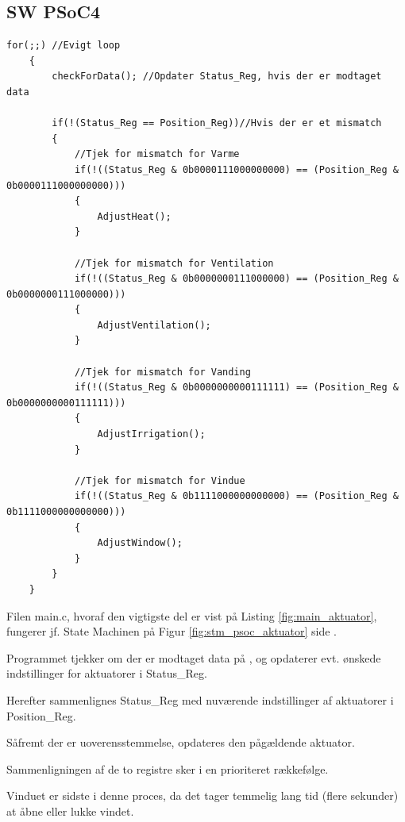 \clearpage

\subsection{SW PSoC4}
\label{subsec:sw_aktuator}

\begin{lstlisting}[caption=Udsnit af main.c for PSoC4 i Aktuator, label=fig:main_aktuator]
    for(;;) //Evigt loop
    {
        checkForData(); //Opdater Status_Reg, hvis der er modtaget data
        
        if(!(Status_Reg == Position_Reg))//Hvis der er et mismatch
        {
            //Tjek for mismatch for Varme
            if(!((Status_Reg & 0b0000111000000000) == (Position_Reg & 0b0000111000000000)))
            {
                AdjustHeat();
            }
            
            //Tjek for mismatch for Ventilation
            if(!((Status_Reg & 0b0000000111000000) == (Position_Reg & 0b0000000111000000)))
            {
                AdjustVentilation();
            }
            
            //Tjek for mismatch for Vanding
            if(!((Status_Reg & 0b0000000000111111) == (Position_Reg & 0b0000000000111111)))
            {
                AdjustIrrigation();
            }
            
            //Tjek for mismatch for Vindue
            if(!((Status_Reg & 0b1111000000000000) == (Position_Reg & 0b1111000000000000)))
            {
                AdjustWindow();
            }
        }
    }
\end{lstlisting}

Filen main.c, hvoraf den vigtigste del er vist på Listing \ref{fig:main_aktuator}, fungerer jf. State Machinen på Figur \ref{fig:stm_psoc_aktuator} side \pageref{fig:stm_psoc_aktuator}.

Programmet tjekker om der er modtaget data på \IIC, og opdaterer evt. ønskede indstillinger for aktuatorer i Status\_Reg. 

Herefter sammenlignes Status\_Reg med nuværende indstillinger af aktuatorer i Position\_Reg.

Såfremt der er uoverensstemmelse, opdateres den pågældende aktuator. 

Sammenligningen af de to registre sker i en prioriteret rækkefølge. 

Vinduet er sidste i denne proces, da det tager temmelig lang tid (flere sekunder) at åbne eller lukke vindet. 

